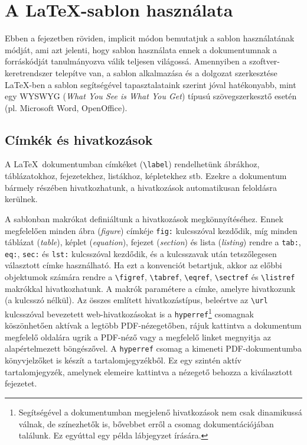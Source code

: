 \section{A \LaTeX-sablon használata}

Ebben a fejezetben röviden, implicit módon bemutatjuk a sablon használatának módját, ami azt jelenti, hogy sablon használata ennek a dokumentumnak a forráskódját tanulmányozva válik teljesen világossá. Amennyiben a szoftver-keretrendszer telepítve van, a sablon alkalmazása és a dolgozat szerkesztése \LaTeX-ben a sablon segítségével tapasztalataink szerint jóval hatékonyabb, mint egy WYSWYG (\emph{What You See is What You Get}) típusú szövegszerkesztő esetén (pl. Microsoft Word, OpenOffice).

\subsection{Címkék és hivatkozások}
A \LaTeX~dokumentumban címkéket (\verb+\label+) rendelhetünk ábrákhoz, táblázatokhoz, fejezetekhez, listákhoz, képletekhez stb. Ezekre a dokumentum bármely részében hivatkozhatunk, a hivatkozások automatikusan feloldásra kerülnek.

A sablonban makrókat definiáltunk a hivatkozások megkönnyítéséhez. Ennek megfelelően minden ábra (\emph{figure}) címkéje \verb+fig:+ kulcsszóval kezdődik, míg minden táblázat (\emph{table}), képlet (\emph{equation}), fejezet (\emph{section}) és lista (\emph{listing}) rendre a \verb+tab:+, \verb+eq:+, \verb+sec:+ és \verb+lst:+ kulcsszóval kezdődik, és a kulcsszavak után tetszőlegesen választott címke használható. Ha ezt a konvenciót betartjuk, akkor az előbbi objektumok számára rendre a \verb+\figref+, \verb+\tabref+, \verb+\eqref+, \verb+\sectref+ és \verb+\listref+ makrókkal hivatkozhatunk. A makrók paramétere a címke, amelyre hivatkozunk (a kulcsszó nélkül). Az összes említett hivatkozástípus, beleértve az \verb+\url+ kulcsszóval bevezetett web-hivatkozásokat is a  \verb+hyperref+\footnote{Segítségével a dokumentumban megjelenő hivatkozások nem csak dinamikussá válnak, de színezhetők is, bővebbet erről a csomag dokumentációjában találunk. Ez egyúttal egy példa lábjegyzet írására.} csomagnak köszönhetően aktívak a legtöbb PDF-nézegetőben, rájuk kattintva a dokumentum megfelelő oldalára ugrik a PDF-néző vagy a megfelelő linket megnyitja az alapértelmezett böngészővel. A \verb+hyperref+ csomag a kimeneti PDF-dokumentumba könyvjelzőket is készít a tartalomjegyzékből. Ez egy szintén aktív tartalomjegyzék, amelynek elemeire kattintva a nézegető behozza a kiválasztott fejezetet.

